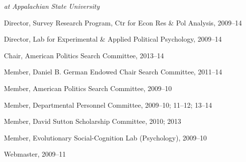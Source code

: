 \documentclass[12pt]{article}
\begin{document}
    \emph{at Appalachian State University}
        \begin{innerlist}
        \item[] Director, Survey Research Program, Ctr for Econ Res \& Pol Analysis, 2009--14
        \item[] Director, Lab for Experimental \& Applied Political Psychology, 2009--14
        \item[] Chair, American Politics Search Committee, 2013--14
        \item[] Member, Daniel B. German Endowed Chair Search Committee, 2011--14  
        \item[] Member, American Politics Search Committee, 2009--10
        \item[] Member, Departmental Personnel Committee, 2009--10; 11--12; 13--14
        \item[] Member, David Sutton Scholarship Committee, 2010; 2013
        \item[] Member, Evolutionary Social-Cognition Lab (Psychology), 2009--10
        \item[] Webmaster, 2009--11
        \end{innerlist}
\end{document}
